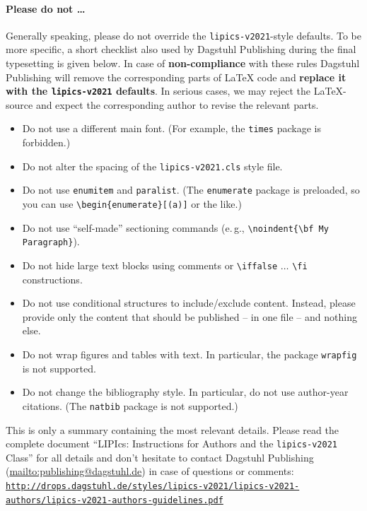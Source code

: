 \documentclass[a4paper,UKenglish,cleveref, autoref, thm-restate, anonymous]{lipics-v2021}
\begin{document}
\paragraph*{Please do not \ldots} %
Generally speaking, please do not override the \texttt{lipics-v2021}-style defaults. To be more specific, a short checklist also used by Dagstuhl Publishing during the final typesetting is given below.
In case of \textbf{non-compliance} with these rules Dagstuhl Publishing will remove the corresponding parts of \LaTeX{} code and \textbf{replace it with the \texttt{lipics-v2021} defaults}. In serious cases, we may reject the LaTeX-source and expect the corresponding author to revise the relevant parts.
\begin{itemize}
\item Do not use a different main font. (For example, the \texttt{times} package is forbidden.)
\item Do not alter the spacing of the \texttt{lipics-v2021.cls} style file.
\item Do not use \verb+enumitem+ and \verb+paralist+. (The \texttt{enumerate} package is preloaded, so you can use
 \verb+\begin{enumerate}[(a)]+ or the like.)
\item Do not use ``self-made'' sectioning commands (e.\,g., \verb+\noindent{\bf My+ \verb+Paragraph}+).
\item Do not hide large text blocks using comments or \verb+\iffalse+ $\ldots$ \verb+\fi+ constructions. 
\item Do not use conditional structures to include/exclude content. Instead, please provide only the content that should be published -- in one file -- and nothing else.
\item Do not wrap figures and tables with text. In particular, the package \texttt{wrapfig} is not supported.
\item Do not change the bibliography style. In particular, do not use author-year citations. (The
\texttt{natbib} package is not supported.)
\end{itemize}

\enlargethispage{\baselineskip}

This is only a summary containing the most relevant details. Please read the complete document ``LIPIcs: Instructions for Authors and the \texttt{lipics-v2021} Class'' for all details and don't hesitate to contact Dagstuhl Publishing (\url{mailto:publishing@dagstuhl.de}) in case of questions or comments:
\href{http://drops.dagstuhl.de/styles/lipics-v2021/lipics-v2021-authors/lipics-v2021-authors-guidelines.pdf}{\texttt{http://drops.dagstuhl.de/styles/lipics-v2021/\newline lipics-v2021-authors/lipics-v2021-authors-guidelines.pdf}}
\end{document}
